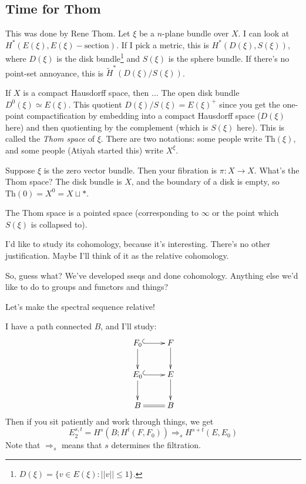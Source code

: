 \subsection{Time for Thom}
This was done by Rene Thom.
Let $\xi$ be a $n$-plane bundle over $X$.
I can look at $H^\ast(E(\xi), E(\xi) - \text{section})$.
If I pick a metric, this is $H^\ast(D(\xi), S(\xi))$, where $D(\xi)$ is the disk bundle\footnote{$D(\xi) = \{v\in E(\xi):||v||\leq 1\}$.} and $S(\xi)$ is the sphere bundle.
If there's no point-set annoyance, this is $\widetilde{H}^\ast(D(\xi)/S(\xi))$.

If $X$ is a compact Hausdorff space, then ...
The open disk bundle $D^0(\xi) \simeq E(\xi)$.
This quotient $D(\xi)/S(\xi) = E(\xi)^+$ since you get the one-point compactification by embedding into a compact Hausdorff space ($D(\xi)$ here) and then quotienting by the complement (which is $S(\xi)$ here).
This is called the \emph{Thom space} of $\xi$.
There are two notations: some people write $\mathrm{Th}(\xi)$, and some people (Atiyah started this) write $X^\xi$.

\begin{example}[Dumb]
    Suppose $\xi$ is the zero vector bundle.
    Then your fibration is $\pi:X \to X$.
    What's the Thom space?
    The disk bundle is $X$, and the boundary of a disk is empty, so $\mathrm{Th}(0) = X^0 = X\sqcup \ast$.
\end{example}

The Thom space is a pointed space (corresponding to $\infty$ or the point which $S(\xi)$ is collapsed to).

I'd like to study its cohomology, because it's interesting.
There's no other justification.
Maybe I'll think of it as the relative cohomology.

So, guess what?
We've developed sseqs and done cohomology.
Anything else we'd like to do to groups and functors and things?

Let's make the spectral sequence relative!

I have a path connected $B$, and I'll study:
\begin{equation*}
    \xymatrix{
	F_0 \ar[d] \ar@{^(->}[r] & F\ar[d]\\
	E_0\ar[d] \ar@{^(->}[r] & E\ar[d]\\
	B\ar@{=}[r] & B
    }
\end{equation*}
Then if you sit patiently and work through things, we get
$$
E^{s,t}_2 = H^s(B; H^t(F, F_0)) \Rightarrow_s H^{s+t}(E, E_0)
$$
Note that $\Rightarrow_s$ means that $s$ determines the filtration.

